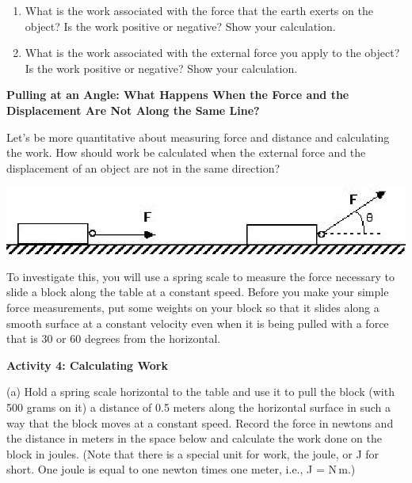 \begin{enumerate}
\item What is the work associated with the force that the earth exerts on the object? Is the work positive or negative? Show your calculation.
\vspace{20mm}

\item What is the work associated with the external force you apply to the object? Is the work positive or negative? Show your calculation.
\vspace{20mm}

\end{enumerate}
\textbf{Pulling at an Angle: What Happens When the Force and the Displacement
Are Not Along the Same Line? }

Let's be more quantitative about measuring force and distance and calculating
the work. How should work be calculated when the external force and the 
displacement of an object are not in the same direction?

\vspace{0.3cm}
{\par\centering \includegraphics{work_power/work_power_fig6.eps} \par}
\vspace{0.3cm}

To investigate this, you will use a spring scale to measure the force necessary
to slide a block along the table at a constant speed. Before you make your simple force measurements, put some weights on your block so that it slides along a smooth surface at a constant velocity even when it is being pulled with a force that is 30 or 60 degrees from the horizontal.

\textbf{Activity 4: Calculating Work} 

(a) Hold a spring scale horizontal to the table and use it to pull the block 
(with 500 grams on it)
a distance of 0.5 meters along the horizontal surface in such a way that the
block moves at a constant speed. Record the force in newtons and the distance
in meters in the space below and calculate the work done on the block in joules.
(Note that there is a special unit for work, the joule, or J for short. One 
joule is equal to one newton times one meter, i.e., J = N\,m.)
\vspace{20mm}

